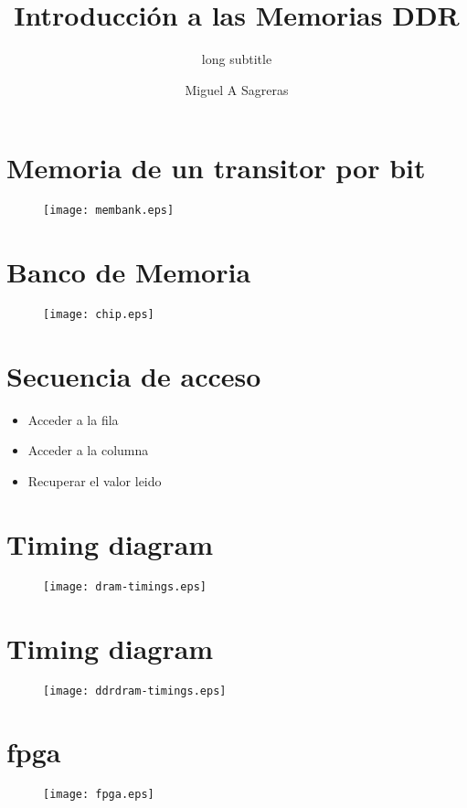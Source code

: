 \documentclass{beamer}
\title[Memoria DDR]{Introducción a las Memorias DDR}
\subtitle[short subtitle]{long subtitle}
\author[msagre]{Miguel A Sagreras}
\date[2015]{}
\begin{document}
\begin{frame}
\titlepage
\tableofcontents
\end{frame}

\section{Memoria de un transitor por bit}
\begin{frame}
\end{frame}

\begin{frame}
\begin{figure}[!htb]
\centering
\texttt{[image: membank.eps]}
\end{figure}
\end{frame}

\section{Banco de Memoria}
\begin{frame}
\begin{figure}[!htb]
\centering
\texttt{[image: chip.eps]}
\end{figure}
\end{frame}

\section{Secuencia de acceso}
\begin{frame}
	\begin{itemize}
		\item Acceder a la fila
		\item Acceder a la columna
		\item Recuperar el valor leido
	\end{itemize}
\end{frame}

\section{Timing diagram}
\begin{frame}
\begin{figure}[!htb]
\centering
\texttt{[image: dram-timings.eps]}
\end{figure}
\end{frame}

\section{Timing diagram}
\begin{frame}
\begin{figure}[!htb]
\centering
\texttt{[image: ddrdram-timings.eps]}
\end{figure}
\end{frame}

\section{fpga}
\begin{frame}
\begin{figure}[!htb]
\centering
\texttt{[image: fpga.eps]}
\end{figure}
\end{frame}
\end{document}
